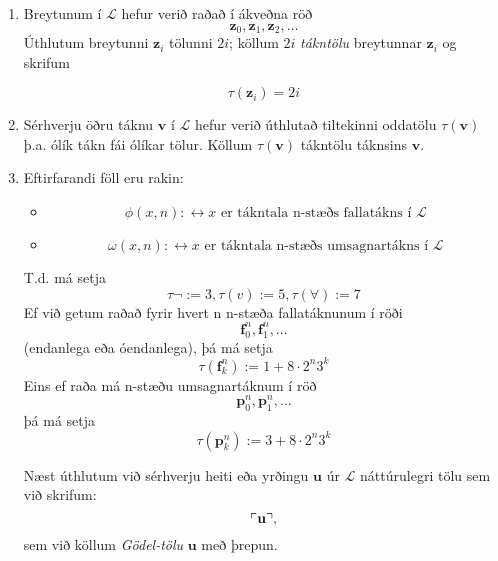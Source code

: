 \documentclass[12pt]{book}
\newcommand{\cL}{\mathcal{L}}
\newcommand{\mb}[1]{\mathbf{#1}}
\newcommand{\bz}{\mathbf{z}}
\newcommand{\bu}{\mathbf{u}}
\newcommand{\bv}{\mathbf{v}}
\DeclarePairedDelimiter{\god}{\ulcorner}{\urcorner}
\begin{document}
\begin{enumerate}[(1)]
\item Breytunum í $\cL$ hefur verið raðað í ákveðna röð
  \[ \bz_0, \bz_1, \bz_2, \dotsc\]
  Úthlutum breytunni $\bz_i$ tölunni $2i$; köllum $2i$
  \emph{tákntölu} breytunnar $\bz_i$ og skrifum
 
  \[\tau(\bz_i) = 2i\]
\item Sérhverju öðru táknu $\bv$ í $\cL$ hefur verið úthlutað
  tiltekinni oddatölu $\tau(\bv)$ þ.a. ólík tákn fái ólíkar tölur.
  Köllum $\tau(\bv)$ tákntölu táknsins $\bv$.
\item Eftirfarandi föll eru rakin:
  \begin{itemize}
  \item \[\phi(x,n): \leftrightarrow x \text{ er tákntala n-stæðs fallatákns  í } \cL\]
  \item \[\omega(x,n): \leftrightarrow x \text{ er tákntala n-stæðs umsagnartákns í } \cL\]
  \end{itemize}

  \begin{ath}
   T.d. má setja 
   \[ \tau{\lnot} := 3, \tau(v) := 5, \tau(\forall) := 7 \]
   Ef við getum raðað fyrir hvert n n-stæða fallatáknunum í röði
   \[\mb{f}_0^n, \mb{f}_1^n, \dotsc \]
   (endanlega eða óendanlega), þá má setja
   \[ \tau(\mb{f}_k^n) := 1 + 8\cdot 2^n 3^k \]
   Eins ef raða má n-stæðu umsagnartáknum í röð
   \[\mb{p}_0^n, \mb{p}_1^n, \dotsc \]
   þá má setja
   \[ \tau(\mb{p}_k^n) :=3 + 8\cdot 2^n 3^k \]

   Næst úthlutum við sérhverju heiti eða
   yrðingu $\bu$ úr $\cL$ náttúrulegri tölu
   sem við skrifum:
   \[ \god{\bu}, \]
   sem við köllum \emph{Gödel-tölu} $\bu$
   með þrepun.
  \end{ath}
\end{enumerate}
\end{document}
